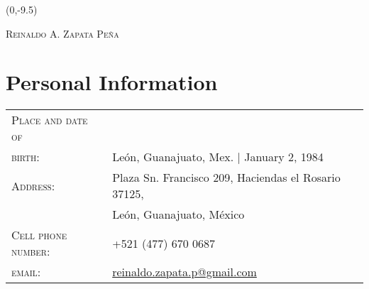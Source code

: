 \documentclass[letterpaper,10pt]{article}
\begin{document}
\begin{textblock}{1}(0,-9.5)
\end{textblock}

\begin{center}
{\Huge \textsc{Reinaldo A. Zapata Pe\~na}}\\[5pt]
{\Large\color{headings}}
\end{center}

\section{Personal Information}
\begin{tabular}{R{4cm}l}
\textsc{Place and date of}  &   \\
\textsc{birth:}             &   Le\'on, Guanajuato, Mex. |  January 2, 1984 \\
\textsc{Address:}           &   Plaza Sn. Francisco 209, Haciendas el Rosario 37125, \\
                            &   Le\'on, Guanajuato, M\'exico \\
\textsc{Cell phone number:} &   +521 (477) 670 0687\\
\textsc{email:}             &   \href{mailto:reinaldo.zapata.p@gmail.com}{reinaldo.zapata.p@gmail.com}
\end{tabular}
\end{document}
